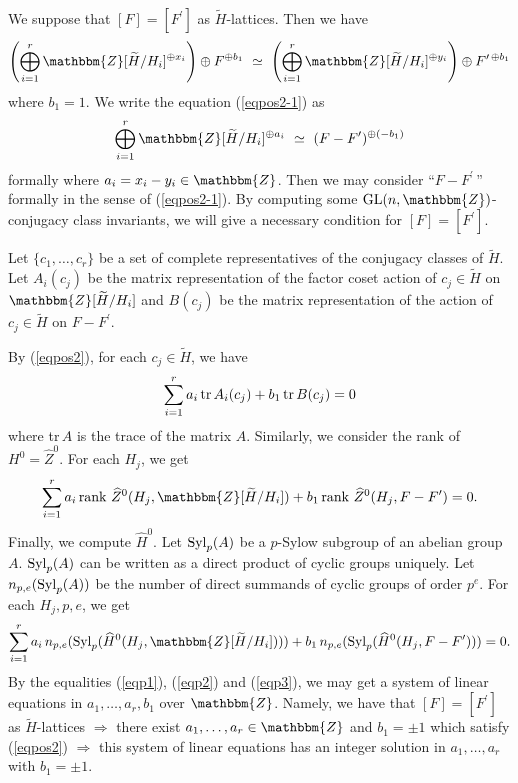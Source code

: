\documentclass{amsart}
\theoremstyle{plain}
\theoremstyle{definition}
\theoremstyle{remark}
\newcommand{\bZ}{\mathbbm{Z}}\newcommand{\bQ}{\mathbbm{Q}}
\newcommand{\GL}{{\rm GL}}\newcommand{\SL}{{\rm SL}}
\newcommand{\Syl}{{\rm Syl}}
\newcounter{sub}\def\tr{\mbox{tr }}
\def\rank{\mbox{\rm rank }}
\begin{document}
We suppose that $[F]=[F^\prime]$ as $\widetilde{H}$-lattices. 
Then we have 
\begin{align}
\left(\bigoplus_{i=1}^r \bZ[\widetilde{H}/H_i]^{\oplus x_i}\right)\oplus F^{\oplus b_1}
\ \simeq\ 
\left(\bigoplus_{i=1}^r \bZ[\widetilde{H}/H_i]^{\oplus y_i}\right)\oplus 
F^{\prime\,\oplus b_1}\label{eqpos2-1}
\end{align}
where $b_1=1$. 
We write the equation (\ref{eqpos2-1}) as 
\begin{align}
\bigoplus_{i=1}^r \bZ[\widetilde{H}/H_i]^{\oplus a_i}\ \simeq\ (F-F^\prime)^{\oplus (-b_1)}\label{eqpos2}
\end{align}
formally where $a_i=x_i-y_i\in\bZ$. 
Then we may consider ``$F-F^\prime$\,'' formally in the sense of 
(\ref{eqpos2-1}). 
By computing some $\GL(n,\bZ)$-conjugacy class invariants, 
we will give a necessary condition for $[F]=[F^\prime]$. 

Let $\{c_1,\ldots,c_r\}$ be a set of complete representatives of 
the conjugacy classes of $\widetilde{H}$. 
Let $A_i(c_j)$ be the matrix representation of the factor coset 
action of $c_j\in \widetilde{H}$ on $\bZ[\widetilde{H}/H_i]$ and 
$B(c_j)$ be the matrix representation of the action of 
$c_j\in \widetilde{H}$ on $F-F^\prime$. 

By (\ref{eqpos2}), for each $c_j\in \widetilde{H}$, we have 
\begin{align}
\sum_{i=1}^r a_i\, {\rm tr}\, A_i(c_j)+ b_1\, {\rm tr}\, B(c_j)=0\label{eqp1}
\end{align}
where {\rm tr}\,$A$ is the trace of the matrix $A$. 
Similarly, we consider the rank of $H^0=\widehat{Z}^0$.  
For each $H_j$, we get
\begin{align}
\sum_{i=1}^r a_i\, \rank \widehat{Z}^0(H_j,\bZ[\widetilde{H}/H_i])
+b_1\, \rank \widehat{Z}^0(H_j,F-F^\prime)=0.\label{eqp2}
\end{align}
Finally, we compute $\widehat{H}^0$.
Let $\Syl_p(A)$ be a $p$-Sylow subgroup of an abelian group $A$.
$\Syl_p(A)$ can be written as a direct product of cyclic groups uniquely.
Let $n_{p,e}(\Syl_p(A))$ be the number of direct summands 
of cyclic groups of order $p^e$. 
For each $H_j,p,e$, we get 
\begin{align}
\sum_{i=1}^r a_i\, n_{p,e}(\Syl_p(\widehat{H}^0(H_j,\bZ[\widetilde{H}/H_i])))
+b_1\, n_{p,e}(\Syl_p(\widehat{H}^0(H_j,F-F^\prime)))=0.\label{eqp3}
\end{align}
By the equalities (\ref{eqp1}), (\ref{eqp2}) and (\ref{eqp3}), we may get a 
system of linear equations in $a_1,\dots,a_r,b_1$ over $\bZ$.
Namely, we have that 
$[F]=[F^\prime]$ as $\widetilde{H}$-lattices 
$\Longrightarrow$ there exist $a_1,\ldots,a_r\in\bZ$ and $b_1=\pm 1$ 
which satisfy (\ref{eqpos2}) $\Longrightarrow$ 
this system of linear equations has an integer solution 
in $a_1,\ldots,a_r$ with $b_1=\pm 1$. 
\end{document}

